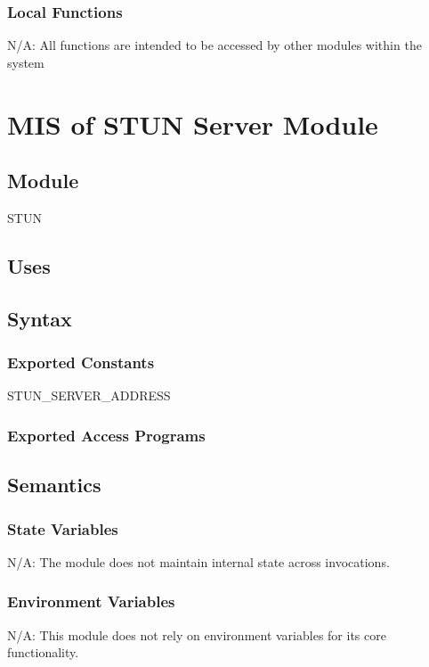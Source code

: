 \documentclass[12pt, titlepage]{article}
\begin{document}
\subsubsection{Local Functions}
N/A: All functions are intended to be accessed by other modules within the system

\section{MIS of STUN Server Module}
\label{sec:stunserver}

\subsection{Module}
STUN

\subsection{Uses}

\subsection{Syntax}

\subsubsection{Exported Constants}
STUN\_SERVER\_ADDRESS

\subsubsection{Exported Access Programs}

\subsection{Semantics}

\subsubsection{State Variables}
N/A: The module does not maintain internal state across invocations.

\subsubsection{Environment Variables}
N/A: This module does not rely on environment variables for its core functionality.
\end{document}
